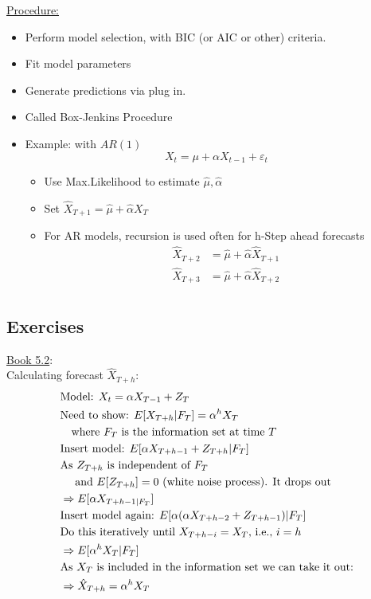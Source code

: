 \underline{Procedure:}
\begin{itemize}
    \item Perform model selection, with BIC (or AIC or other) criteria.
    \item Fit model parameters
    \item Generate predictions via plug in. 
    \item Called Box-Jenkins Procedure
    \item Example: with $AR(1)$
    \[X_t=\mu+\alpha X_{t-1}+\varepsilon_t \]
    \begin{itemize}
        \item Use Max.Likelihood to estimate $\hat{\mu}, \hat{\alpha}$
        \item Set $\hat{X}_{T+1}= \hat{\mu} + \hat{\alpha}X_T$
        \item For AR models, recursion is used often for h-Step ahead forecasts
        \begin{align*}
            \hat{X}_{T+2} &= \hat{\mu} +\hat{\alpha} \hat{X}_{T+1}\\
            \hat{X}_{T+3} &= \hat{\mu} +\hat{\alpha} \hat{X}_{T+2}\\
        \end{align*}
    \end{itemize}
\end{itemize}

\subsection{Exercises}

\underline{Book 5.2}: \\

\quad Calculating forecast $\hat{X}_{T+h}$:
\begin{align*}
   &\text{Model: } X_t = \alpha X_{T-1} + Z_T \\
   &\text{Need to show: } E[X_{T+h}|F_T] = \alpha^h X_T \\
   &\text{\quad where $F_T$ is the information set at time $T$} \\
   &\text{Insert model: } E[\alpha X_{T+h-1} + Z_{T+h}|F_T] \\
   &\text{As $Z_{T+h}$ is independent of $F_T$} \\
   &\text{ \quad and $E[Z_{T+h}]=0$ (white noise process). It drops out} \\
   &\Rightarrow E[\alpha X_{T+h-1|F_T}] \\
   &\text{Insert model again: } E[\alpha(\alpha X_{T+h-2} + Z_{T+h-1}) |F_T] \\
   &\text{Do this iteratively until $X_{T+h-i} = X_T$, i.e., $i=h$} \\
   &\Rightarrow E[\alpha^h X_T|F_T] \\
   &\text{As $X_T$ is included in the information set we can take it out:}\\
   &\Rightarrow \hat{X}_{T+h}= \alpha^h X_T
\end{align*}

